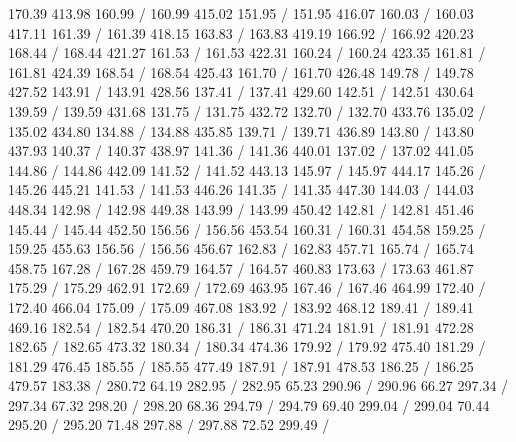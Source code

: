{ 170.39 413.98 160.99 /
 160.99 415.02 151.95 /
 151.95 416.07 160.03 /
 160.03 417.11 161.39 /
 161.39 418.15 163.83 /
 163.83 419.19 166.92 /
 166.92 420.23 168.44 /
 168.44 421.27 161.53 /
 161.53 422.31 160.24 /
 160.24 423.35 161.81 /
 161.81 424.39 168.54 /
 168.54 425.43 161.70 /
 161.70 426.48 149.78 /
 149.78 427.52 143.91 /
 143.91 428.56 137.41 /
 137.41 429.60 142.51 /
 142.51 430.64 139.59 /
 139.59 431.68 131.75 /
 131.75 432.72 132.70 /
 132.70 433.76 135.02 /
 135.02 434.80 134.88 /
 134.88 435.85 139.71 /
 139.71 436.89 143.80 /
 143.80 437.93 140.37 /
 140.37 438.97 141.36 /
 141.36 440.01 137.02 /
 137.02 441.05 144.86 /
 144.86 442.09 141.52 /
 141.52 443.13 145.97 /
 145.97 444.17 145.26 /
 145.26 445.21 141.53 /
 141.53 446.26 141.35 /
 141.35 447.30 144.03 /
 144.03 448.34 142.98 /
 142.98 449.38 143.99 /
 143.99 450.42 142.81 /
 142.81 451.46 145.44 /
 145.44 452.50 156.56 /
 156.56 453.54 160.31 /
 160.31 454.58 159.25 /
 159.25 455.63 156.56 /
 156.56 456.67 162.83 /
 162.83 457.71 165.74 /
 165.74 458.75 167.28 /
 167.28 459.79 164.57 /
 164.57 460.83 173.63 /
 173.63 461.87 175.29 /
 175.29 462.91 172.69 /
 172.69 463.95 167.46 /
 167.46 464.99 172.40 /
 172.40 466.04 175.09 /
 175.09 467.08 183.92 /
 183.92 468.12 189.41 /
 189.41 469.16 182.54 /
 182.54 470.20 186.31 /
 186.31 471.24 181.91 /
 181.91 472.28 182.65 /
 182.65 473.32 180.34 /
 180.34 474.36 179.92 /
 179.92 475.40 181.29 /
 181.29 476.45 185.55 /
 185.55 477.49 187.91 /
 187.91 478.53 186.25 /
 186.25 479.57 183.38 /
\setsolid
{} 280.72 64.19 282.95 /
 282.95 65.23 290.96 /
 290.96 66.27 297.34 /
 297.34 67.32 298.20 /
 298.20 68.36 294.79 /
 294.79 69.40 299.04 /
 299.04 70.44 295.20 /
 295.20 71.48 297.88 /
 297.88 72.52 299.49 /
}
